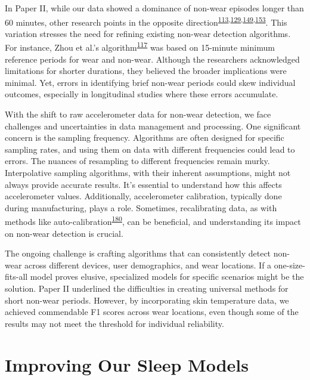 \documentclass[
  10pt,
]{scrbook}
\begin{document}
In Paper II, while our data showed a dominance of non-wear episodes
longer than 60 minutes, other research points in the opposite
direction\textsuperscript{\protect\hyperlink{ref-aadland_comparison_2018}{113},\protect\hyperlink{ref-jaeschke_variability_2018}{129},\protect\hyperlink{ref-hutto_identifying_2013}{149},\protect\hyperlink{ref-vert_detecting_2022}{153}}.
This variation stresses the need for refining existing non-wear
detection algorithms. For instance, Zhou et al.'s
algorithm\textsuperscript{\protect\hyperlink{ref-zhou_classification_2015}{117}}
was based on 15-minute minimum reference periods for wear and non-wear.
Although the researchers acknowledged limitations for shorter durations,
they believed the broader implications were minimal. Yet, errors in
identifying brief non-wear periods could skew individual outcomes,
especially in longitudinal studies where these errors accumulate.

With the shift to raw accelerometer data for non-wear detection, we face
challenges and uncertainties in data management and processing. One
significant concern is the sampling frequency. Algorithms are often
designed for specific sampling rates, and using them on data with
different frequencies could lead to errors. The nuances of resampling to
different frequencies remain murky. Interpolative sampling algorithms,
with their inherent assumptions, might not always provide accurate
results. It's essential to understand how this affects accelerometer
values. Additionally, accelerometer calibration, typically done during
manufacturing, plays a role. Sometimes, recalibrating data, as with
methods like
auto-calibration\textsuperscript{\protect\hyperlink{ref-hees_2014}{180}},
can be beneficial, and understanding its impact on non-wear detection is
crucial.

The ongoing challenge is crafting algorithms that can consistently
detect non-wear across different devices, user demographics, and wear
locations. If a one-size-fits-all model proves elusive, specialized
models for specific scenarios might be the solution. Paper II underlined
the difficulties in creating universal methods for short non-wear
periods. However, by incorporating skin temperature data, we achieved
commendable F1 scores across wear locations, even though some of the
results may not meet the threshold for individual reliability.

\hypertarget{improving-our-sleep-models}{%
\section{Improving Our Sleep Models}\label{improving-our-sleep-models}}
\end{document}
